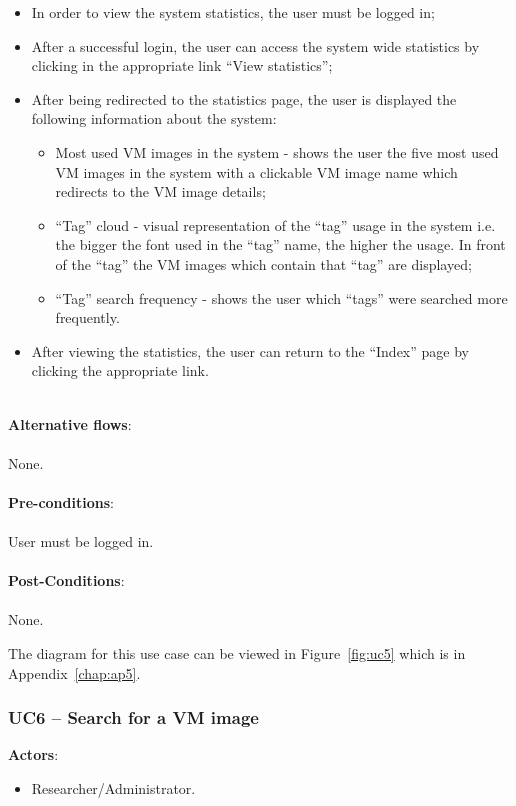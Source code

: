 \begin{itemize}
\item In order to view the system statistics, the user must be logged in;
\item After a successful login, the user can access the system wide statistics by clicking in the appropriate link ``View statistics'';
\item After being redirected to the statistics page, the user is displayed the following information about the system:
	\begin{itemize}
	\item Most used VM images in the system - shows the user the five most used VM images in the system with a clickable VM image name which redirects to the VM image details;
	\item ``Tag'' cloud - visual representation of the ``tag'' usage in the system i.e. the bigger the font used in the ``tag'' name, the higher the usage. In front of the ``tag'' the VM images which contain that ``tag'' are displayed;
	\item ``Tag'' search frequency - shows the user which ``tags'' were searched more frequently.
	\end{itemize}
\item After viewing the statistics, the user can return to the ``Index'' page by clicking the appropriate link.
\end{itemize}

\ \\
\textbf{Alternative flows}:\\
\ \\
None.\\
\ \\
\textbf{Pre-conditions}:\\
\ \\
User must be logged in.\\
\ \\
\textbf{Post-Conditions}:\\
\ \\
None.

The diagram for this use case can be viewed in Figure~\ref{fig:uc5} which is in Appendix~\ref{chap:ap5}.

\subsubsection{UC6 -- Search for a VM image}\label{uc6}

\textbf{Actors}:

\begin{itemize}
\item Researcher/Administrator.
\end{itemize}

